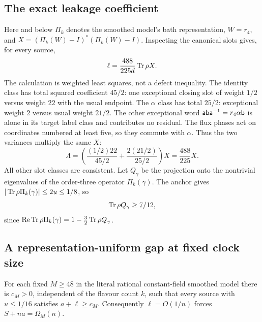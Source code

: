 \subsection{The exact leakage coefficient}

Here and below $\Pi_k$ denotes the smoothed model's bath
representation, $W=r_4$, and
$X=(\Pi_k(W)-I)^*(\Pi_k(W)-I)$.
Inspecting the canonical slots gives, for every source,
\begin{equation}\label{eq:actual-houghton-leakage}
 \ell=\frac{488}{225d}\operatorname{Tr}\rho X.
\end{equation}
The calculation is weighted least squares, not a defect inequality.
The identity class has total squared coefficient $45/2$:
one exceptional closing slot of weight $1/2$ versus weight $22$
with the usual endpoint. The $\alpha$ class has total $25/2$:
exceptional weight $2$ versus usual weight $21/2$.
The other exceptional word $\mathsf a\mathsf b\mathsf a^{-1}=r_4\alpha\mathsf b$
is alone in its target label class and contributes no residual.
The flux phases act on coordinates numbered at least five, so they
commute with $\alpha$. Thus the two variances multiply the same $X$:
\[
 \Lambda=\left(\frac{(1/2)22}{45/2}
                  +\frac{2(21/2)}{25/2}\right)X
          =\frac{488}{225}X .
\]
All other slot classes are consistent.
Let $Q_\gamma$ be the projection onto the nontrivial eigenvalues
of the order-three operator $\Pi_k(\gamma)$. The anchor gives
$|\operatorname{Tr}\rho\Pi_k(\gamma)|\leq2u\leq1/8$, so
\begin{equation}\label{eq:actual-houghton-charge}
 \operatorname{Tr}\rho Q_\gamma\geq7/12,
\end{equation}
since $\operatorname{Re}\operatorname{Tr}\rho\Pi_k(\gamma)
=1-\tfrac32\operatorname{Tr}\rho Q_\gamma$.

\subsection{A representation-uniform gap at fixed clock size}

\begin{theorem}\label{thm:fixed-clock}
For each fixed $M\geq48$ in the literal rational constant-field
smoothed model there is $c_M>0$, independent of the flavour count $k$,
such that every source with $u\leq1/16$ satisfies $a+\ell\geq c_M$.
Consequently $\ell=O(1/n)$ forces $S+na=\Omega_M(n)$.
\end{theorem}

